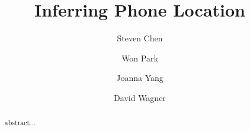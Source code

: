 \documentclass{article}
\begin{document}
\title{Inferring Phone Location}
\author{Steven Chen \and Won Park \and Joanna Yang \and David Wagner}
\maketitle

\begin{abstract}
abstract...
\end{abstract}







\nocite{}



\end{document}
